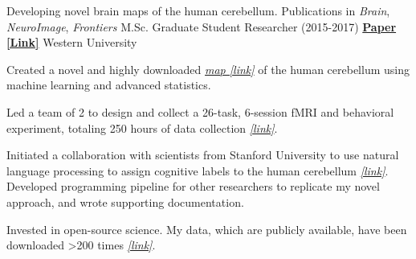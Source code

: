 \begin{cventries}
  \cventry
    {Developing novel brain maps of the human cerebellum. Publications in \textit{Brain}, \textit{NeuroImage}, \textit{Frontiers}}
    {M.Sc. Graduate Student Researcher (2015-2017)} %
    {\href{http://ivrylab.berkeley.edu/uploads/4/1/1/5/41152143/functional_boundaries_in_the_human_cerebellum.pdf}{\textbf{Paper [Link]}}}
    {Western University} %
    {
      \begin{cvitems} %
        \item {Created a novel and highly downloaded {\href{http://www.diedrichsenlab.org/imaging/mdtb.htm}{\textit{ map [link]}}} of the human cerebellum using machine learning and advanced statistics.}
      	\item {Led a team of 2 to design and collect a 26-task, 6-session fMRI and behavioral experiment, totaling 250 hours of data collection {\href{http://www.diedrichsenlab.org/imaging/AtlasViewer/viewer.html}{\textit{[link]}}}.}
      	\item {Initiated a collaboration with scientists from Stanford University to use natural language processing to assign cognitive labels to the human cerebellum {\href{https://cognitiveatlas.org/}{\textit{[link]}}}. Developed programming pipeline for other researchers to replicate my novel approach, and wrote supporting documentation.}
      	\item {Invested in open-source science. My data, which are publicly available, have been downloaded >200 times {\href{https://openneuro.org/datasets/ds002105/versions/1.1.0}{\textit{[link]}}}.}
      \end{cvitems}
    }

\end{cventries}
